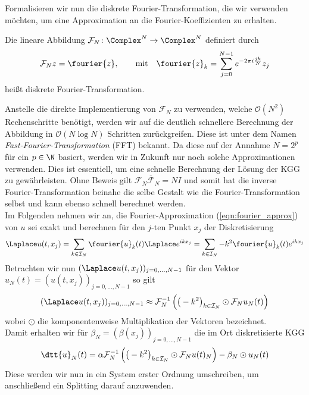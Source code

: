 Formalisieren wir nun die diskrete Fourier-Transformation, die wir verwenden möchten, um eine Approximation an die Fourier-Koeffizienten zu erhalten.
\begin{mathdef}
Die lineare Abbildung $\mathcal{F}_N\colon\Complex^N\to\Complex^N$ definiert durch
\[\mathcal{F}_Nz=\fourier{z},\qquad\text{mit}\quad \fourier{z}_k=\sum_{j=0}^{N-1}e^{-2\pi i\frac{jk}{N}}z_j\]
heißt diskrete Fourier-Transformation.
\end{mathdef}
Anstelle die direkte Implementierung von $\mathcal{F}_N$ zu verwenden, welche $\mathcal{O}(N^2)$ Rechenschritte benötigt, werden wir auf die deutlich schnellere Berechnung der Abbildung in $\mathcal{O}(N\log N)$ Schritten zurückgreifen. Diese ist unter dem Namen \emph{Fast-Fourier-Transformation} (FFT) bekannt. Da diese auf der Annahme $N=2^p$ für ein $p\in\N$ basiert, werden wir in Zukunft nur noch solche Approximationen verwenden. Dies ist essentiell, um eine schnelle Berechnung der Lösung der KGG zu gewährleisten. Ohne Beweis gilt $\mathcal{F}_N\overline{\mathcal{F}}_N=NI$ und somit hat die inverse Fourier-Transformation beinahe die selbe Gestalt wie die Fourier-Transformation selbst und kann ebenso schnell berechnet werden.\\
Im Folgenden nehmen wir an, die Fourier-Approximation (\ref{eqn:fourier_approx}) von $u$ sei exakt und berechnen für den $j$-ten Punkt $x_j$ der Diskretisierung
\begin{equation}
\label{eqn:laplace_approxu}
\Laplace u(t,x_j)=\sum_{k\in\mathcal{I}_N}\fourier{u}_k(t)\Laplace e^{ikx_j}=\sum_{k\in\mathcal{I}_N}-k^2\fourier{u}_k(t)e^{ikx_j}
\end{equation}
Betrachten wir nun $(\Laplace u(t,x_j))_{j=0,\dots,N-1}$ für den Vektor $u_N(t)=(u(t,x_j))_{j=0,\dots,N-1}$ so gilt
\[(\Laplace u(t,x_j))_{j=0,\dots,N-1}\approx \mathcal{F}_N^{-1}\left(\big(-k^2\big)_{k\in\mathcal{I}_N}\odot\mathcal{F}_Nu_N(t)\right)\]
wobei $\odot$ die komponentenweise Multiplikation der Vektoren bezeichnet.\\
Damit erhalten wir für $\beta_N=(\beta(x_j))_{j=0,\dots,N-1}$ die im Ort diskretisierte KGG
\begin{equation}
\label{eqn:kgg_discretespace}
\dtt{u}_N(t)=\alpha \mathcal{F}_N^{-1}\left(\big(-k^2\big)_{k\in\mathcal{I}_N}\odot\mathcal{F}_Nu(t)_N\right) -\beta_N\odot u_N(t)
\end{equation}
Diese werden wir nun in ein System erster Ordnung umschreiben, um anschließend ein Splitting darauf anzuwenden. 

